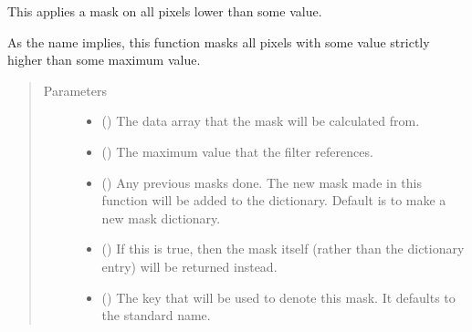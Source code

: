 \documentclass[letterpaper,10pt,english]{sphinxmanual}
\begin{document}
\begin{fulllineitems}
\label{\detokenize{python_docstrings/IfA_Smeargle.echo.masks.masks_echo200:IfA_Smeargle.echo.masks.masks_echo200.echo271_maximum_cut}}
This applies a mask on all pixels lower than some value.

As the name implies, this function masks all pixels with some value
strictly higher than some maximum value.
\begin{quote}\begin{description}
\item[{Parameters}] \leavevmode\begin{itemize}
\item {} 
 () \textendash{} The data array that the mask will be calculated from.

\item {} 
 () \textendash{} The maximum value that the filter references.

\item {} 
 (\sphinxstyleliteralemphasis{\sphinxupquote{ (}}\sphinxstyleliteralemphasis{\sphinxupquote{)}}) \textendash{} Any previous masks done. The new mask made in this function will be
added to the dictionary. Default is to make a new mask dictionary.

\item {} 
 (\sphinxstyleliteralemphasis{\sphinxupquote{ (}}\sphinxstyleliteralemphasis{\sphinxupquote{)}}) \textendash{} If this is true, then the mask itself (rather than the dictionary
entry) will be returned instead.

\item {} 
 (\sphinxstyleliteralemphasis{\sphinxupquote{ (}}\sphinxstyleliteralemphasis{\sphinxupquote{)}}) \textendash{} The key that will be used to denote this mask. It defaults to the
standard name.


\end{itemize}
\end{description}
\end{quote}
\end{fulllineitems}
\end{document}
